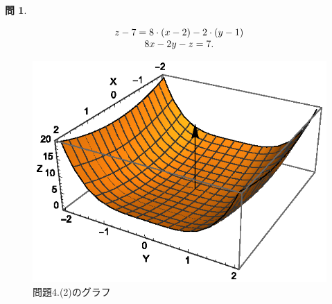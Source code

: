 \documentclass[12pt]{article} %
\theoremstyle{definition}
\newtheorem{question}{問}
\begin{document}
\begin{question}
\begin{enumerate}[(1)]
\begin{equation*}
					\begin{array}[]{c}
						z-7=8\cdot(x-2)-2\cdot(y-1)\\
						8x-2y-z=7.
					\end{array}
				\end{equation*}
			\begin{figure}[h!]
				\centering
				\includegraphics{4d2}
				\caption{問題4.(2)のグラフ}
			\end{figure}
	\end{enumerate}
\end{question}
\end{document}
